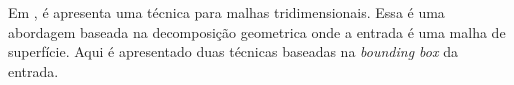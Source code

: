 Em \citet{bib:Glut08}, é apresenta uma técnica para malhas tridimensionais. Essa é uma abordagem baseada na decomposição geometrica onde a entrada é uma malha de superfície. Aqui é apresentado duas técnicas baseadas na \textit{bounding box} da entrada.



% 
% 

% 
% 


